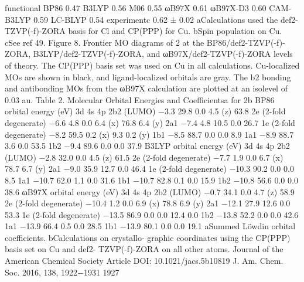 functional
BP86
0.47
B3LYP
0.56
M06
0.55
ωB97X
0.61
ωB97X-D3
0.60
CAM-B3LYP
0.59
LC-BLYP
0.54
experimentc
0.62 ± 0.02
aCalculations used the def2-TZVP(-f)-ZORA basis for Cl and
CP(PPP) for Cu. bSpin population on Cu. cSee ref 49.
Figure 8. Frontier MO diagrams of 2 at the BP86/def2-TZVP(-f)-ZORA, B3LYP/def2-TZVP(-f)-ZORA, and ωB97X/def2-TZVP(-f)-ZORA levels
of theory. The CP(PPP) basis set was used on Cu in all calculations. Cu-localized MOs are shown in black, and ligand-localized orbitals are gray. The
b2 bonding and antibonding MOs from the ωB97X calculation are plotted at an isolevel of 0.03 au.
Table 2. Molecular Orbital Energies and Coeﬃcientsa for 2b
BP86
orbital
energy
(eV)
3d
4s
4p
2b2 (LUMO)
−3.3
29.8
0.0
4.5 (z)
63.8
2e (2-fold degenerate)
−6.6
4.8
0.0
6.4 (x)
76.8
6.4 (y)
2a1
−7.4
4.8
10.5
0.0
26.7
1e (2-fold degenerate)
−8.2
59.5
0.2 (x)
9.3
0.2 (y)
1b1
−8.5
88.7
0.0
0.0
8.9
1a1
−8.9
88.7
3.6
0.0
53.5
1b2
−9.4
89.6
0.0
0.0
37.9
B3LYP
orbital
energy
(eV)
3d
4s
4p
2b2 (LUMO)
−2.8
32.0
0.0
4.5 (z)
61.5
2e (2-fold degenerate)
−7.7
1.9
0.0
6.7 (x)
78.7
6.7 (y)
2a1
−9.0
35.9
12.7
0.0
46.4
1e (2-fold degenerate)
−10.3
90.2
0.0
0.0
8.5
1a1
−10.7
62.0
1.1
0.0
31.6
1b1
−10.7
82.8
0.1
0.0
15.9
1b2
−10.8
56.6
0.0
0.0
38.6
ωB97X
orbital
energy
(eV)
3d
4s
4p
2b2 (LUMO)
−0.7
34.1
0.0
4.7 (z)
58.9
2e (2-fold degenerate)
−10.4
1.2
0.0
6.9 (x)
78.8
6.9 (y)
2a1
−12.1
27.9
12.6
0.0
53.3
1e (2-fold degenerate)
−13.5
86.9
0.0
0.0
12.4
0.0
1b2
−13.8
52.2
0.0
0.0
42.6
1a1
−13.9
66.4
0.5
0.0
28.5
1b1
−13.9
80.1
0.0
0.0
19.1
aSummed Löwdin orbital coeﬃcients. bCalculations on crystallo-
graphic coordinates using the CP(PPP) basis set on Cu and def2-
TZVP(-f)-ZORA on all other atoms.
Journal of the American Chemical Society
Article
DOI: 10.1021/jacs.5b10819
J. Am. Chem. Soc. 2016, 138, 1922−1931
1927


